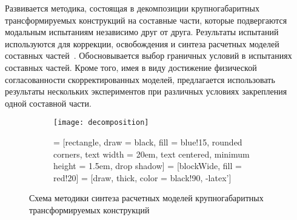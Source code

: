 Развивается методика, состоящая в декомпозиции крупногабаритных трансформируемых конструкций на составные части, которые подвергаются модальным испытаниям независимо друг от друга. Результаты испытаний используются для коррекции, освобождения и синтеза расчетных моделей составных частей~. Обосновывается выбор граничных условий в испытаниях составных частей. Кроме того, имея в виду достижение физической согласованности скорректированных моделей, предлагается использовать результаты нескольких экспериментов при различных условиях закрепления одной составной части.

\begin{figure}[!htb]
	\centering
	\begin{subfigure}[b]{0.45\textwidth}
		\texttt{[image: decomposition]}
	\end{subfigure}
	\hfill
	\begin{subfigure}[b]{0.45\textwidth}
         = [rectangle, draw = black, fill = blue!15, rounded corners, text width = 20em, text centered, minimum height = 1.5em, drop shadow] 
         = [blockWide, fill = red!20]
         = [draw, thick, color = black!90, -latex'] 
        \scriptsize 
        \def\nodeDist{0.3cm}
	\end{subfigure}
    \caption{Схема методики синтеза расчетных моделей крупногабаритных трансформируемых конструкций} \label{fig:schemeDecomposition}
    \vspace{1em}
\end{figure}  

